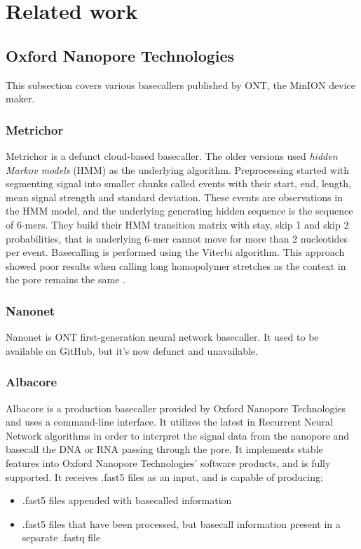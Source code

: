 \documentclass[times, utf8, diplomski, english]{fer}
\begin{document}
\section{Related work}

\subsection{Oxford Nanopore Technologies}
This subsection covers various basecallers published by ONT, the MinION device maker.
\subsubsection{Metrichor}

Metrichor is a defunct cloud-based basecaller. The older versions used \textit{hidden Markov models} (HMM) as the underlying algorithm. Preprocessing started with segmenting signal into smaller chunks called events with their start, end, length, mean signal strength and standard deviation. These events are observations in the HMM model, and the underlying generating hidden sequence is the sequence of 6-mers. They build their HMM transition matrix with stay, skip 1 and skip 2 probabilities, that is underlying 6-mer cannot move for more than 2 nucleotides per event. Basecalling is performed using the Viterbi algorithm. This approach showed poor results when calling long homopolymer stretches as the context in the pore remains the same \cite{homopolymers}\cite{homopolimeri_analiza}.

\subsubsection{Nanonet}
Nanonet is ONT first-generation neural network basecaller. It used to be available on GitHub, but it's now defunct and unavailable.

\subsubsection{Albacore}
Albacore is a production basecaller provided by Oxford Nanopore Technologies and uses a command-line interface. It
utilizes the latest in Recurrent Neural Network algorithms in order to interpret the signal data from the
nanopore and basecall the DNA or RNA passing through the pore. It implements stable features into
Oxford Nanopore Technologies’ software products, and is fully supported. It receives .fast5 files as an
input, and is capable of producing: 
\begin{itemize}
    \item .fast5 files appended with basecalled information
    \item .fast5 files that have been processed, but basecall information present in a separate .fastq file
\end{itemize}
\end{document}

